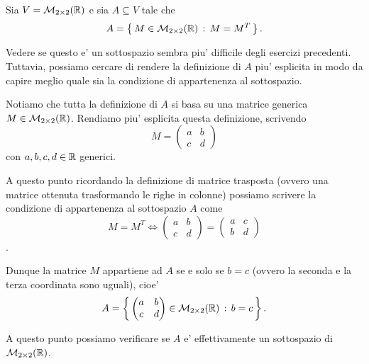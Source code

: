 \begin{example}
    Sia $V = \mathcal{M}_{2 \times 2}(\mathbb{R})$ e sia $A \subseteq V$ tale che \[
        A = \left\{\,M \in \mathcal{M}_{2 \times 2}(\mathbb{R}) \,:\, M = M^T\,\right\}.
    \]

    Vedere se questo e' un sottospazio sembra piu' difficile degli esercizi precedenti. Tuttavia, possiamo cercare di rendere la definizione di $A$ piu' esplicita in modo da capire meglio quale sia la condizione di appartenenza al sottospazio.

    Notiamo che tutta la definizione di $A$ si basa su una matrice generica $M \in \mathcal{M}_{2 \times 2}(\mathbb{R})$. Rendiamo piu' esplicita questa definizione, scrivendo \[
        M = \begin{pmatrix}
            a & b \\ c & d
        \end{pmatrix}    
    \] con $a, b, c, d \in \mathbb{R}$ generici.

    A questo punto ricordando la definizione di matrice trasposta (ovvero una matrice ottenuta trasformando le righe in colonne) possiamo scrivere la condizione di appartenenza al sottospazio $A$ come \[
        M = M^T \iff \begin{pmatrix}
            a & b \\ c & d
        \end{pmatrix} = \begin{pmatrix}
            a & c \\ b & d
        \end{pmatrix}
    \].
    
    Dunque la matrice $M$ appartiene ad $A$ se e solo se $b = c$ (ovvero la seconda e la terza coordinata sono uguali), cioe' \[
        A = \left\{\,\begin{pmatrix}
            a & b \\ c & d
        \end{pmatrix} \in \mathcal{M}_{2 \times 2}(\mathbb{R}) \,:\, b = c\,\right\}.
    \]

    A questo punto possiamo verificare se $A$ e' effettivamente un sottospazio di $\mathcal{M}_{2 \times 2}(\mathbb{R})$.


\end{example}
